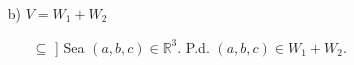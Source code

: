 \documentclass[fleqn]{article}
\begin{document}
\begin{enumerate}
\begin{enumerate}
            \item[b)] $ V = W_1 + W_2 $ \par
            
            \begin{enumerate}
                \item[$ \subseteq $]] Sea $ (a,b,c) \in \mathbb{R}^3 $. P.d. $ (a,b,c) \in W_1 + W_2 $. \par
                
            \end{enumerate}

        \end{enumerate}
        
        
        
    \end{enumerate}
\end{document}
